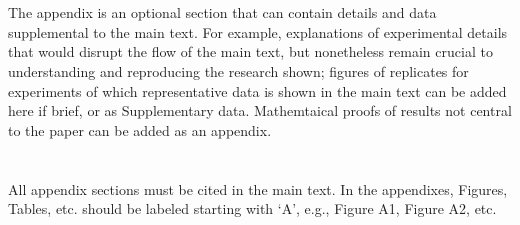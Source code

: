 \documentclass[entropy,article,submit,moreauthors,pdftex,10pt,a4paper]{mdpi}
\begin{document}





\appendix
\section{}
The appendix is an optional section that can contain details and data supplemental to the main text. For example, explanations of experimental details that would disrupt the flow of the main text, but nonetheless remain crucial to understanding and reproducing the research shown; figures of replicates for experiments of which representative data is shown in the main text can be added here if brief, or as Supplementary data. Mathemtaical proofs of results not central to the paper can be added as an appendix.

\section{}
All appendix sections must be cited in the main text. In the appendixes, Figures, Tables, etc. should be labeled starting with `A', e.g., Figure A1, Figure A2, etc. 
\end{document}
